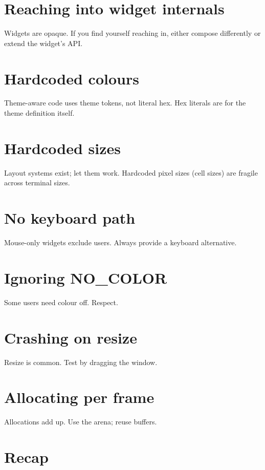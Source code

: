 \section{Reaching into widget internals}

Widgets are opaque. If you find yourself reaching in,
either compose differently or extend the widget's API.

\section{Hardcoded colours}

Theme-aware code uses theme tokens, not literal hex. Hex
literals are for the theme definition itself.

\section{Hardcoded sizes}

Layout systems exist; let them work. Hardcoded pixel
sizes (cell sizes) are fragile across terminal sizes.

\section{No keyboard path}

Mouse-only widgets exclude users. Always provide a
keyboard alternative.

\section{Ignoring NO\_COLOR}

Some users need colour off. Respect.

\section{Crashing on resize}

Resize is common. Test by dragging the window.

\section{Allocating per frame}

Allocations add up. Use the arena; reuse buffers.

\section{Recap}

